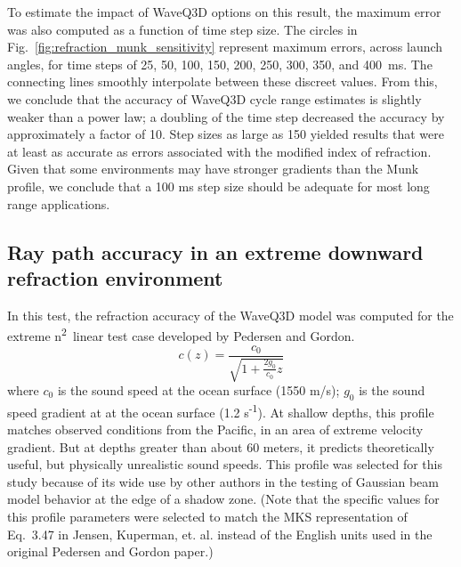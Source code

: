 \documentclass{ws-jca}
\begin{document}
To estimate the impact of WaveQ3D options on this result, the maximum error
was also computed as a function of time step size. The circles in
Fig.~\ref{fig:refraction_munk_sensitivity} represent maximum errors, across
launch angles, for time steps of 25, 50, 100, 150, 200, 250, 300, 350, and
400~ms. The connecting lines smoothly interpolate between these discreet
values. From this, we conclude that the accuracy of WaveQ3D cycle range
estimates is slightly weaker than a power law; a doubling of the time step
decreased the accuracy by approximately a factor of 10. Step sizes as large
as 150 yielded results that were at least as accurate as errors associated
with the modified index of refraction. Given that some environments may
have stronger gradients than the Munk profile, we conclude that a 100 ms
step size should be adequate for most long range applications.

\subsection{Ray path accuracy in an extreme downward refraction environment}

In this test, the refraction accuracy of the WaveQ3D model was computed for the
extreme n\textsuperscript{2}~linear test case developed by Pedersen and
Gordon.\cite{Pedersen1972}
\begin{equation}
	c(z) = \frac{c_0}{\sqrt{1+\frac{2 g_0}{c_0}z}}
	\label{eq:pedersen_profile}
\end{equation}
where
\(c_0\) is the sound speed at the ocean surface (1550 m/s); 
\(g_0\) is the sound speed gradient at at the ocean surface (1.2 s\textsuperscript{-1}).
At shallow depths, this profile matches observed conditions from the
Pacific, in an area of extreme velocity gradient. But at depths greater
than about 60 meters, it predicts theoretically useful, but physically
unrealistic sound speeds. This profile was selected for this study because
of its wide use by other authors in the testing of Gaussian beam model
behavior at the edge of a shadow zone.\cite{Porter1987,Weinberg1996} (Note
that the specific values for this profile parameters were selected to match
the MKS representation of Eq.~3.47 in Jensen, Kuperman, et.
al.\cite{Jensen1994} instead of the English units used in the original
Pedersen and Gordon paper.) 
\end{document}
